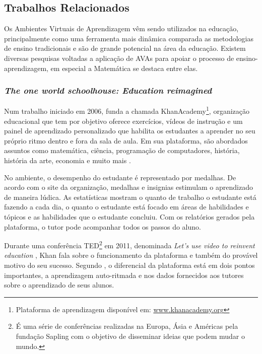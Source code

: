 \subsection{Trabalhos Relacionados}

Os Ambientes Virtuais de Aprendizagem vêm sendo utilizados na educação, principalmente como uma ferramenta mais dinâmica comparada as metodologias de ensino tradicionais e são de grande potencial na 
área da educação. Existem diversas pesquisas voltadas a aplicação de AVAs para apoiar o processo de ensino-aprendizagem, em especial a Matemática se destaca entre elas.

\subsubsection{\textit{The one world schoolhouse: Education reimagined}}
Num trabalho iniciado em 2006,  funda a chamada KhanAcademy\footnote{Plataforma de aprendizagem disponível em: \url{www.khanacademy.org}}, organização educacional que tem por objetivo oferece exercícios, vídeos de instrução e um painel de aprendizado personalizado que habilita os estudantes a aprender no seu próprio ritmo dentro e fora da sala de aula. Em sua plataforma, são abordados assuntos como matemática, ciência, programação de computadores, história, história da arte, economia e muito mais \cite{khan2012one}.

No ambiente, o desempenho do estudante é representado por medalhas. De acordo com o site da organização, medalhas e insignias estimulam o aprendizado de maneira lúdica. As estatísticas mostram o quanto de trabalho o estudante está fazendo a cada dia, o quanto o estudante está focado em áreas de habilidades e tópicos e as habilidades que o estudante concluiu. Com os relatórios gerados pela plataforma, o tutor pode acompanhar todos os passos do aluno.

Durante uma conferência TED\footnote{É uma série de conferências realizadas na Europa, Ásia e Américas pela fundação Sapling com o objetivo de disseminar ideias que podem mudar o mundo.} em 2011, denominada \textit{Let's use video to reinvent education} \cite{tedtalk2011reinvend}, Khan fala sobre o funcionamento da plataforma e também do provável motivo do seu sucesso. Segundo , o diferencial da plataforma está em dois pontos importantes, a aprendizagem auto-ritmada e nos dados fornecidos aos tutores sobre o aprendizado de seus alunos. 

